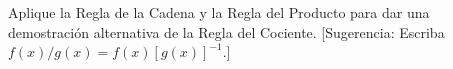 \item Aplique la Regla de la Cadena y la Regla del Producto para dar una demostración alternativa de la Regla del Cociente. [Sugerencia: Escriba $f(x)/g(x) = f(x)[g(x)]^{-1}$.]
